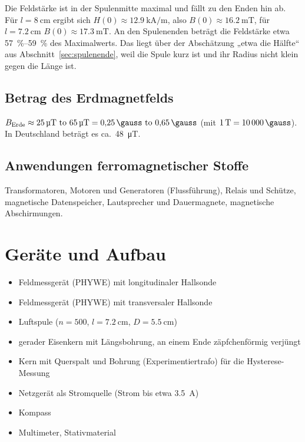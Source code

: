\documentclass[a4paper,11pt]{article}
\begin{document}
Die Feldstärke ist in der Spulenmitte maximal und fällt zu den Enden hin ab.
Für $l=\SI{8}{\centi\meter}$ ergibt sich $H(0)\approx\SI{12.9}{\kilo\ampere\per\meter}$,
also $B(0)\approx\SI{16.2}{\milli\tesla}$, für $l=\SI{7.2}{\centi\meter}$
$B(0)\approx\SI{17.3}{\milli\tesla}$. An den Spulenenden beträgt die Feldstärke
etwa \SIrange{57}{59}{\percent} des Maximalwerts. Das liegt über der Abschätzung
„etwa die Hälfte“ aus Abschnitt~\ref{sec:spulenende}, weil die Spule kurz ist und
ihr Radius nicht klein gegen die Länge ist.

\subsection{Betrag des Erdmagnetfelds}
$B_\mathrm{Erde}\approx\SIrange{25}{65}{\micro\tesla}=\SIrange{0.25}{0.65}{\gauss}$
(mit $\SI{1}{\tesla}=\SI{10000}{\gauss}$). In Deutschland beträgt es ca.\ \SI{48}{\micro\tesla}.

\subsection{Anwendungen ferromagnetischer Stoffe}
Transformatoren, Motoren und Generatoren (Flussführung), Relais und Schütze,
magnetische Datenspeicher, Lautsprecher und Dauermagnete, magnetische
Abschirmungen.

\clearpage

\section{Geräte und Aufbau}
\begin{itemize}
  \item Feldmessgerät (PHYWE) mit longitudinaler Hallsonde
  \item Feldmessgerät (PHYWE) mit transversaler Hallsonde
  \item Luftspule ($n=500$, $l=\SI{7.2}{\centi\meter}$, $D=\SI{5.5}{\centi\meter}$)
  \item gerader Eisenkern mit Längsbohrung, an einem Ende zäpfchenförmig verjüngt
  \item Kern mit Querspalt und Bohrung (Experimentiertrafo) für die Hysterese-Messung
  \item Netzgerät als Stromquelle (Strom bis etwa \SI{3.5}{\ampere})
  \item Kompass
  \item Multimeter, Stativmaterial
\end{itemize}
\end{document}
